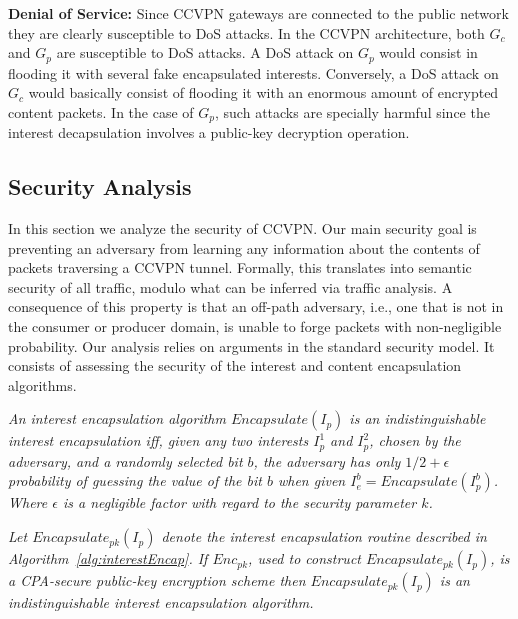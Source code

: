 \textbf{Denial of Service:} Since CCVPN gateways are connected to the public network they are clearly susceptible to DoS attacks. In the CCVPN architecture, both $G_c$ and $G_p$ are susceptible to DoS attacks. A DoS attack on $G_p$ would consist in flooding it with several fake encapsulated interests. Conversely, a DoS attack on $G_c$ would basically consist of flooding it with an enormous amount of encrypted content packets. In the case of $G_p$, such attacks are specially harmful since the interest decapsulation involves a public-key decryption operation.

\subsection{Security Analysis}

In this section we analyze the security of CCVPN. Our main security goal is
preventing an adversary from learning any information about the contents of
packets traversing a CCVPN tunnel. Formally, this translates into semantic
security of all traffic, modulo what can be inferred via traffic analysis.
A consequence of this property is that an off-path adversary, i.e., one that is
not in the consumer or producer domain, is unable to forge packets with
non-negligible probability. Our analysis relies on arguments in the standard
security model. It consists of assessing the security of the interest and
content encapsulation algorithms.

\begin{definition}\label{def1}
\textit{
An interest encapsulation algorithm $Encapsulate(I_p)$ is an indistinguishable interest encapsulation iff, given any two interests $I_p^1$ and $I_p^2$, chosen by the adversary, and a randomly selected bit $b$, the adversary has only $1/2 + \epsilon$ probability of guessing the value of the bit $b$ when given $I_e^b = Encapsulate(I_p^b)$. Where $\epsilon$ is a negligible factor with regard to the security parameter $k$.
}
\end{definition}

\begin{theorem}\label{theo1}
\textit{
Let $Encapsulate_{pk}(I_p)$ denote the interest encapsulation routine described in Algorithm~\ref{alg:interestEncap}. If $Enc_{pk}$, used to construct $Encapsulate_{pk}(I_p)$, is a CPA-secure public-key encryption scheme then $Encapsulate_{pk}(I_p)$ is an indistinguishable interest encapsulation algorithm.
}
\end{theorem}


